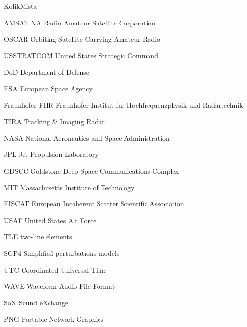 \begin{seznamzkratek}{KolikMista}

      {AMSAT-NA}                             %
      {Radio Amateur Satellite Corporation}  %

      {OSCAR}
      {Orbiting Satellite Carrying Amateur Radio}

      {USSTRATCOM}
      {United States Strategic Command}

      {DoD}
      {Department of Defense}

      {ESA}
      {European Space Agency}

      {Fraunhofer-FHR}
      {Fraunhofer-Institut fur Hochfrequenzphysik und Radartechnik}

      {TIRA}
      {Tracking \& Imaging Radar}

      {NASA}
      {National Aeronautics and Space Administration}

      {JPL}
      {Jet Propulsion Laboratory}

      {GDSCC}
      {Goldstone Deep Space Communications Complex}

      {MIT}
      {Massachusetts Institute of Technology}

      {EISCAT}
      {European Incoherent Scatter Scientific Association}

      {USAF}
      {United States Air Force}

      {TLE}
      {two-line elements}

      {SGP4}
      {Simplified perturbations models}

      {UTC}
      {Coordinated Universal Time}

      {WAVE}
      {Waveform Audio File Format}

      {SoX}
      {Sound eXchange}

      {PNG}
      {Portable Network Graphics}



\end{seznamzkratek}
